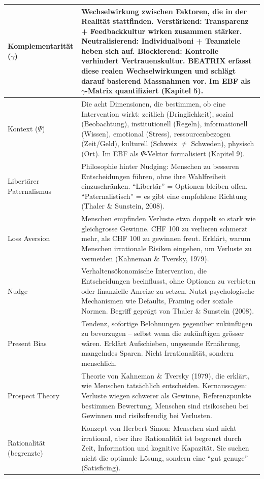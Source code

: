 \documentclass[11pt,a4paper]{article}
\begin{document}
\begin{longtable}{@{}L{4cm}L{10cm}@{}}
\midrule
Komplementarität ($\gamma$) & Wechselwirkung zwischen Faktoren, die in der Realität stattfinden. Verstärkend: Transparenz + Feedbackkultur wirken zusammen stärker. Neutralisierend: Individualboni + Teamziele heben sich auf. Blockierend: Kontrolle verhindert Vertrauenskultur. BEATRIX erfasst diese realen Wechselwirkungen und schlägt darauf basierend Massnahmen vor. Im EBF als $\gamma$-Matrix quantifiziert (Kapitel 5). \\
\midrule
Kontext ($\Psi$) & Die acht Dimensionen, die bestimmen, ob eine Intervention wirkt: zeitlich (Dringlichkeit), sozial (Beobachtung), institutionell (Regeln), informationell (Wissen), emotional (Stress), ressourcenbezogen (Zeit/Geld), kulturell (Schweiz $\neq$ Schweden), physisch (Ort). Im EBF als $\Psi$-Vektor formalisiert (Kapitel 9). \\
\midrule
Libertärer Paternalismus & Philosophie hinter Nudging: Menschen zu besseren Entscheidungen führen, ohne ihre Wahlfreiheit einzuschränken. ``Libertär'' = Optionen bleiben offen. ``Paternalistisch'' = es gibt eine empfohlene Richtung (Thaler \& Sunstein, 2008). \\
\midrule
Loss Aversion & Menschen empfinden Verluste etwa doppelt so stark wie gleichgrosse Gewinne. CHF 100 zu verlieren schmerzt mehr, als CHF 100 zu gewinnen freut. Erklärt, warum Menschen irrationale Risiken eingehen, um Verluste zu vermeiden (Kahneman \& Tversky, 1979). \\
\midrule
Nudge & Verhaltensökonomische Intervention, die Entscheidungen beeinflusst, ohne Optionen zu verbieten oder finanzielle Anreize zu setzen. Nutzt psychologische Mechanismen wie Defaults, Framing oder soziale Normen. Begriff geprägt von Thaler \& Sunstein (2008). \\
\midrule
Present Bias & Tendenz, sofortige Belohnungen gegenüber zukünftigen zu bevorzugen -- selbst wenn die zukünftigen grösser wären. Erklärt Aufschieben, ungesunde Ernährung, mangelndes Sparen. Nicht Irrationalität, sondern menschlich. \\
\midrule
Prospect Theory & Theorie von Kahneman \& Tversky (1979), die erklärt, wie Menschen tatsächlich entscheiden. Kernaussagen: Verluste wiegen schwerer als Gewinne, Referenzpunkte bestimmen Bewertung, Menschen sind risikoscheu bei Gewinnen und risikofreudig bei Verlusten. \\
\midrule
Rationalität (begrenzte) & Konzept von Herbert Simon: Menschen sind nicht irrational, aber ihre Rationalität ist begrenzt durch Zeit, Information und kognitive Kapazität. Sie suchen nicht die optimale Lösung, sondern eine ``gut genuge'' (Satisficing). \\

\end{longtable}
\end{document}

